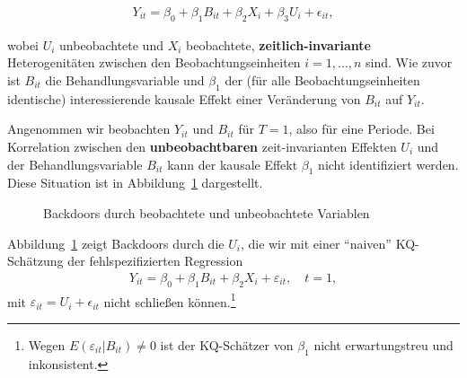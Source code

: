 \documentclass[
  a4paper,
  DIV=11,
  oneside]{scrreprt}
\begin{document}
\begin{align}
  Y_{it} = \beta_0 + \beta_1 B_{it} + \beta_2 X_i + \beta_3 U_i + \epsilon_{it},\label{eq:unobshetmodel}
\end{align}

wobei \(U_i\) unbeobachtete und \(X_i\) beobachtete,
\textbf{zeitlich-invariante} Heterogenitäten zwischen den
Beobachtungseinheiten \(i=1,\dots,n\) sind. Wie zuvor ist \(B_{it}\) die
Behandlungsvariable und \(\beta_1\) der (für alle Beobachtungseinheiten
identische) interessierende kausale Effekt einer Veränderung von
\(B_{it}\) auf \(Y_{it}\).

Angenommen wir beobachten \(Y_{it}\) und \(B_{it}\) für \(T=1\), also
für eine Periode. Bei Korrelation zwischen den \textbf{unbeobachtbaren}
zeit-invarianten Effekten \(U_i\) und der Behandlungsvariable \(B_{it}\)
kann der kausale Effekt \(\beta_1\) nicht identifiziert werden. Diese
Situation ist in Abbildung~\ref{fig-FEDAG1} dargestellt.

\begin{figure}[t]


\caption{\label{fig-FEDAG1}Backdoors durch beobachtete und unbeobachtete
Variablen}

\end{figure}%

Abbildung~\ref{fig-FEDAG1} zeigt Backdoors durch die \(U_i\), die wir
mit einer ``naiven'' KQ-Schätzung der fehlspezifizierten Regression
\begin{align}
  Y_{it} = \beta_0 + \beta_1 B_{it} + \beta_2 X_i + \varepsilon_{it},\quad t=1,\label{eq:femodelfail}
\end{align} mit \(\varepsilon_{it} = U_i + \epsilon_{it}\) nicht
schließen können.\footnote{Wegen
  \(E(\varepsilon_{it}\vert B_{it})\neq 0\) ist der KQ-Schätzer von
  \(\beta_1\) nicht erwartungstreu und inkonsistent.}
\end{document}
